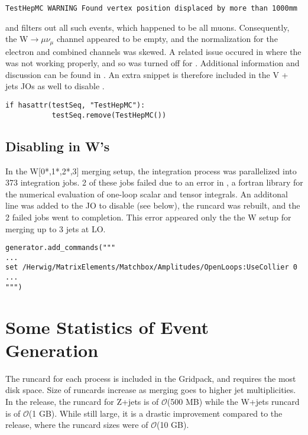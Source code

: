 \begin{verbatim}
TestHepMC WARNING Found vertex position displaced by more than 1000mm
\end{verbatim}

\noindent and filters out all such events, which happened to be all muons. Consequently, the W$\rightarrow\mu\nu_{\mu}$ channel appeared to be empty, and the normalization for the electron and combined channels was skewed. A related issue occured in  where the  was not working properly, and so  was turned off for . Additional information and discussion can be found in \href{https://its.cern.ch/jira/browse/AGENE-1412?focusedCommentId=1672872&page=com.atlassian.jira.plugin.system.issuetabpanels%3Acomment-tabpanel#comment-1672872}{\textcolor{blue}{\code{AGENE-1412}}}. An extra snippet is therefore included in the V + jets JOs as well to disable \code{TestHepMC}. 

\begin{verbatim}
if hasattr(testSeq, "TestHepMC"):
           testSeq.remove(TestHepMC())
\end{verbatim}

\subsection{Disabling  in W's}

In the W[0*,1*,2*,3] merging setup, the integration process was parallelized into 373 integration jobs. 2 of these jobs failed due to an error in , a fortran library for the numerical evaluation of one-loop scalar and tensor integrals. An additonal line was added to the JO to disable  (see below), the runcard was rebuilt, and the 2 failed jobs went to completion. This error appeared only the the W setup for merging up to 3 jets at LO.

\begin{verbatim}
generator.add_commands("""
...
set /Herwig/MatrixElements/Matchbox/Amplitudes/OpenLoops:UseCollier 0
...
""")

\end{verbatim}

\section{Some Statistics of Event Generation}

The runcard for each process is included in the Gridpack, and requires the most disk space. Size of runcards increase as merging goes to higher jet multiplicities. In the  release, the runcard for Z+jets is of $\mathcal{O}$(500 MB) while the W+jets runcard is of $\mathcal{O}$(1 GB). While still large, it is a drastic improvement compared to the  release, where the runcard sizes were of $\mathcal{O}$(10 GB).

